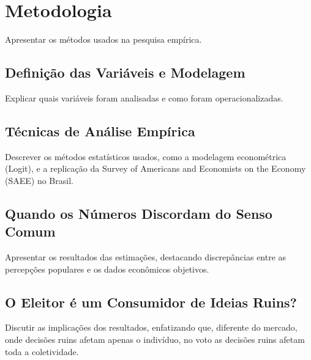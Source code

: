 


\chapter{Metodologia} %

Apresentar os métodos usados na pesquisa empírica.

\section{Definição das Variáveis e Modelagem} %

Explicar quais variáveis foram analisadas e como foram operacionalizadas.

\section{Técnicas de Análise Empírica} %

Descrever os métodos estatísticos usados, como a modelagem econométrica (Logit), e a replicação da Survey of Americans and Economists on the Economy (SAEE) no Brasil.

\section{Quando os Números Discordam do Senso Comum} %

Apresentar os resultados das estimações, destacando discrepâncias entre as percepções populares e os dados econômicos objetivos.

\section{O Eleitor é um Consumidor de Ideias Ruins? } %

Discutir as implicações dos resultados, enfatizando que, diferente do mercado, onde decisões ruins afetam apenas o indivíduo, no voto as decisões ruins afetam toda a coletividade.

